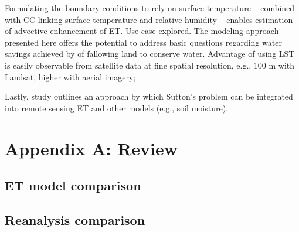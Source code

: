 \documentclass{article}
\begin{document}
    Formulating the boundary conditions to rely on surface temperature -- combined with CC linking surface temperature and relative humidity -- enables estimation of advective enhancement of ET.
    Use case explored. 
    The modeling approach presented here offers the potential to address basic questions regarding water savings achieved by of fallowing land to conserve water.
    Advantage of using LST is easily observable from satellite data at fine spatial resolution, e.g., 100 m with Landsat, higher with aerial imagery;
    
    Lastly, study outlines an approach by which Sutton's problem  can be integrated into remote sensing ET and other models (e.g., soil moisture).
    
    \section*{Appendix A: Review }
    
    \subsection{ET model comparison}
    \subsection{Reanalysis comparison }
    
\end{document}

